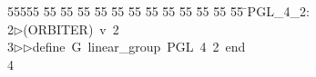 %
%
\begin{tabbing}
55555 \= 55 \= 55 \= 55 \= 55 \= 55 \= 55 \= 55 \= 55 \= 55 \= 55 \= 55 \= 55 \= \>PGL\_4\_2:\\[0pt]
2\>$\triangleright$\>(ORBITER)\ v\ 2\ \\[0pt]
3\>$\triangleright$\>$\triangleright$\>define\ G\ linear\_group\ PGL\ 4\ 2\ end\\[0pt]
4\>\end{tabbing}
